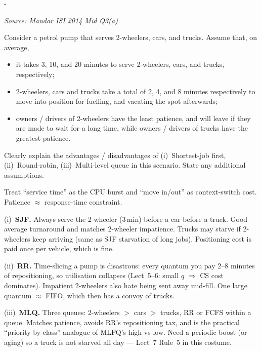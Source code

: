 \documentclass[11pt,a4paper]{article}
\makeatletter
\newcommand{\keepspace}[1]{\par\penalty-100\begingroup
  \setlength{\dimen@}{#1}\dimen@ii\pagegoal\advance\dimen@ii-\pagetotal
  \ifdim\dimen@>\dimen@ii\ifdim\dimen@ii>\z@\vfil\fi\break\fi\endgroup}
\newcounter{qn}[section]
\newenvironment{Qn}[4]{%
  \refstepcounter{qn}\keepspace{7\baselineskip}%
  \begin{tcolorbox}[qboxstyle, title={Q\thesection.\theqn\ \ [#1 \textbar\ #2]\ \ #4}]%
  {\footnotesize\color{g3}\textit{Source: #3}}\par\smallskip%
}{%
  \end{tcolorbox}%
}
\newenvironment{Sol}{%
  \begin{tcolorbox}[sboxstyle, title={Solution}]%
}{%
  \end{tcolorbox}\vspace{0.35em}%
}
\makeatother
\begin{document}
\begin{Qn}{Medium}{Lect 5--6}{Mandar ISI 2014 Mid Q3(a)}{Petrol pump: SJF vs.\ RR vs.\ multi-level queue}
Consider a petrol pump that serves 2-wheelers, cars, and trucks. Assume that, on average,
\begin{itemize}
  \item it takes 3, 10, and 20 minutes to serve 2-wheelers, cars, and trucks, respectively;
  \item 2-wheelers, cars and trucks take a total of 2, 4, and 8 minutes respectively to move into position for fuelling, and vacating the spot afterwards;
  \item owners / drivers of 2-wheelers have the least patience, and will leave if they are made to wait for a long time, while owners / drivers of trucks have the greatest patience.
\end{itemize}
Clearly explain the advantages / disadvantages of (i)~Shortest-job first, (ii)~Round-robin, (iii)~Multi-level queue in this scenario. State any additional assumptions.
\end{Qn}
\begin{Sol}
Treat ``service time'' as the CPU burst and ``move in/out'' as context-switch cost. Patience $\approx$ response-time constraint.

(i)~\textbf{SJF.} Always serve the 2-wheeler (3\,min) before a car before a truck. Good average turnaround and matches 2-wheeler impatience. Trucks may starve if 2-wheelers keep arriving (same as SJF starvation of long jobs). Positioning cost is paid once per vehicle, which is fine.

(ii)~\textbf{RR.} Time-slicing a pump is disastrous: every quantum you pay 2--8 minutes of repositioning, so utilisation collapses (Lect~5--6: small $q$ $\Rightarrow$ CS cost dominates). Impatient 2-wheelers also hate being sent away mid-fill. One large quantum $\approx$ FIFO, which then has a convoy of trucks.

(iii)~\textbf{MLQ.} Three queues: 2-wheelers $>$ cars $>$ trucks, RR or FCFS within a queue. Matches patience, avoids RR's repositioning tax, and is the practical ``priority by class'' analogue of MLFQ's high-vs-low. Need a periodic boost (or aging) so a truck is not starved all day --- Lect~7 Rule~5 in this costume.
\end{Sol}
\end{document}
